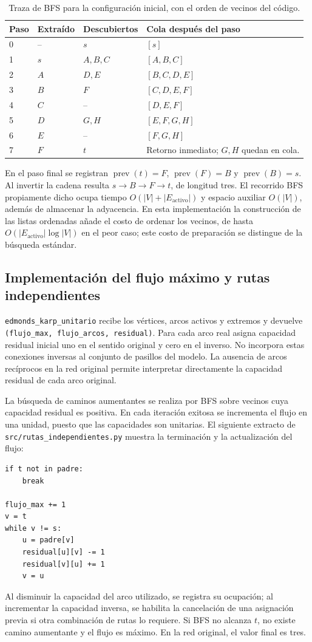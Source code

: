 \documentclass[11pt,a4paper]{article}
\begin{document}
\begin{table}[H]
\centering\small
\caption{Traza de BFS para la configuración inicial, con el orden de vecinos del código.}
\begin{tabularx}{\textwidth}{l l l X}
\toprule
Paso & Extraído & Descubiertos & Cola después del paso \\
\midrule
0 & -- & $s$ & $[s]$\\
1 & $s$ & $A,B,C$ & $[A,B,C]$\\
2 & $A$ & $D,E$ & $[B,C,D,E]$\\
3 & $B$ & $F$ & $[C,D,E,F]$\\
4 & $C$ & -- & $[D,E,F]$\\
5 & $D$ & $G,H$ & $[E,F,G,H]$\\
6 & $E$ & -- & $[F,G,H]$\\
7 & $F$ & $t$ & Retorno inmediato; $G,H$ quedan en cola.\\
\bottomrule
\end{tabularx}
\end{table}
En el paso final se registran $\operatorname{prev}(t)=F$, $\operatorname{prev}(F)=B$ y $\operatorname{prev}(B)=s$. Al invertir la cadena resulta $s\to B\to F\to t$, de longitud tres. El recorrido BFS propiamente dicho ocupa tiempo $O(|V|+|E_{\mathrm{activo}}|)$ y espacio auxiliar $O(|V|)$, además de almacenar la adyacencia. En esta implementación la construcción de las listas ordenadas añade el costo de ordenar los vecinos, de hasta $O(|E_{\mathrm{activo}}|\log |V|)$ en el peor caso; este costo de preparación se distingue de la búsqueda estándar.

\subsection{Implementación del flujo máximo y rutas independientes}
\texttt{edmonds\_karp\_unitario} recibe los vértices, arcos activos y extremos y devuelve \texttt{(flujo\_max, flujo\_arcos, residual)}. Para cada arco real asigna capacidad residual inicial uno en el sentido original y cero en el inverso. No incorpora estas conexiones inversas al conjunto de pasillos del modelo. La ausencia de arcos recíprocos en la red original permite interpretar directamente la capacidad residual de cada arco original.

La búsqueda de caminos aumentantes se realiza por BFS sobre vecinos cuya capacidad residual es positiva. En cada iteración exitosa se incrementa el flujo en una unidad, puesto que las capacidades son unitarias. El siguiente extracto de \texttt{src/rutas\_independientes.py} muestra la terminación y la actualización del flujo:
\begin{lstlisting}
if t not in padre:
    break

flujo_max += 1
v = t
while v != s:
    u = padre[v]
    residual[u][v] -= 1
    residual[v][u] += 1
    v = u
\end{lstlisting}
Al disminuir la capacidad del arco utilizado, se registra su ocupación; al incrementar la capacidad inversa, se habilita la cancelación de una asignación previa si otra combinación de rutas lo requiere. Si BFS no alcanza $t$, no existe camino aumentante y el flujo es máximo. En la red original, el valor final es tres.
\end{document}

